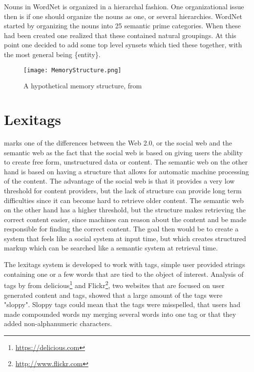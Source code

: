 Nouns in WordNet is organized in a hierarchal fashion.
One organizational issue then is if one should organize the nouns as one, or several hierarchies.
WordNet started by organizing the nouns into 25 semantic prime categories.
When these had been created one realized that these contained natural groupings.
At this point one decided to add some top level synsets which tied these together,
with the most general being \{entity\}\citep{Miller1990a}.

\begin{figure}[h]
    \begin{center}
        \texttt{[image: MemoryStructure.png]}
        \caption{A hypothetical memory structure, from \protect \citet{Collins1969}}
        \label{MemoryStructure}
    \end{center}
\end{figure}


\section{Lexitags}
\label{Lexitags}
\citet{Veres2011} marks one of the differences between the Web 2.0, or the social web and the semantic web as the
fact that the social web is based on giving users the ability to create free form, unstructured data or content.
The semantic web on the other hand is based on having a structure that allows for automatic machine processing of the content.
The advantage of the social web is that it provides a very low threshold for content providers,
but the lack of structure can provide long term difficulties since it can become hard to retrieve older content.
The semantic web on the other hand has a higher threshold,
but the structure makes retrieving the correct content easier,
since machines can reason about the content and be made responsible for finding the correct content.
The goal then would be to create a system that feels like a social system at input time,
but which creates structured markup which can be searched like a semantic system at retrieval time.

The lexitags system is developed to work with tags,
simple user provided strings containing one or a few words that are tied to the object of interest.
Analysis of tags by \citet{Tonkin2006} from delicious\footnote{\url{https://delicious.com}} and Flickr\footnote{\url{http://www.flickr.com}},
two websites that are focused on user generated content and tags,
showed that a large amount of the tags were "sloppy".
Sloppy tags could mean that the tags were misspelled,
that users had made compounded words my merging several words into one tag
or that they added non-alphanumeric characters.


